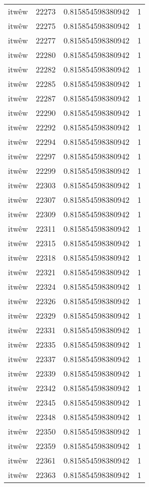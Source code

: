 \begin{longtable}{llll}
itwêw & 22273 & 0.815854598380942 & 1 \\
itwêw & 22275 & 0.815854598380942 & 1 \\
itwêw & 22277 & 0.815854598380942 & 1 \\
itwêw & 22280 & 0.815854598380942 & 1 \\
itwêw & 22282 & 0.815854598380942 & 1 \\
itwêw & 22285 & 0.815854598380942 & 1 \\
itwêw & 22287 & 0.815854598380942 & 1 \\
itwêw & 22290 & 0.815854598380942 & 1 \\
itwêw & 22292 & 0.815854598380942 & 1 \\
itwêw & 22294 & 0.815854598380942 & 1 \\
itwêw & 22297 & 0.815854598380942 & 1 \\
itwêw & 22299 & 0.815854598380942 & 1 \\
itwêw & 22303 & 0.815854598380942 & 1 \\
itwêw & 22307 & 0.815854598380942 & 1 \\
itwêw & 22309 & 0.815854598380942 & 1 \\
itwêw & 22311 & 0.815854598380942 & 1 \\
itwêw & 22315 & 0.815854598380942 & 1 \\
itwêw & 22318 & 0.815854598380942 & 1 \\
itwêw & 22321 & 0.815854598380942 & 1 \\
itwêw & 22324 & 0.815854598380942 & 1 \\
itwêw & 22326 & 0.815854598380942 & 1 \\
itwêw & 22329 & 0.815854598380942 & 1 \\
itwêw & 22331 & 0.815854598380942 & 1 \\
itwêw & 22335 & 0.815854598380942 & 1 \\
itwêw & 22337 & 0.815854598380942 & 1 \\
itwêw & 22339 & 0.815854598380942 & 1 \\
itwêw & 22342 & 0.815854598380942 & 1 \\
itwêw & 22345 & 0.815854598380942 & 1 \\
itwêw & 22348 & 0.815854598380942 & 1 \\
itwêw & 22350 & 0.815854598380942 & 1 \\
itwêw & 22359 & 0.815854598380942 & 1 \\
itwêw & 22361 & 0.815854598380942 & 1 \\
itwêw & 22363 & 0.815854598380942 & 1 \\

\end{longtable}
